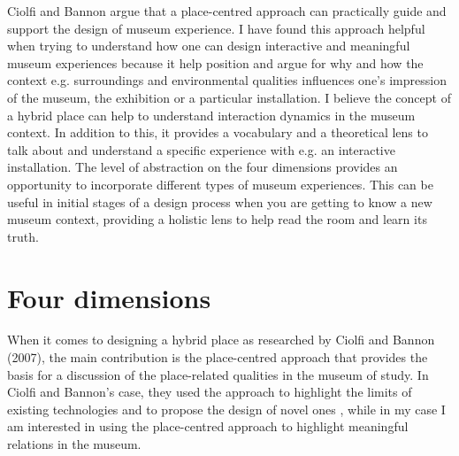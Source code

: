 \break

Ciolfi and Bannon argue that a place-centred approach can practically guide and support the design of museum experience. I have found this approach helpful when trying to understand how one can design interactive and meaningful museum experiences because it help position and argue for why and how the context e.g. surroundings and environmental qualities influences one's impression of the museum, the exhibition or a particular installation. I believe the concept of a hybrid place can help to understand interaction dynamics in the museum context. In addition to this, it provides a vocabulary and a theoretical lens to talk about and understand a specific experience with e.g. an interactive installation. The level of abstraction on the four dimensions provides an opportunity to incorporate different types of museum experiences. This can be useful in initial stages of a design process when you are getting to know a new museum context, providing a holistic lens to help read the room and learn its truth. 



\section{Four dimensions}
When it comes to designing a hybrid place as researched by Ciolfi and Bannon (2007), the main contribution is the place-centred approach that provides the basis for a discussion of the place-related qualities in the museum of study. In Ciolfi and Bannon's case, they used the approach to highlight the limits of existing technologies and to propose the design of novel ones \autocite[p. 163]{hybridplace_ciolfi}, while in my case I am interested in using the place-centred approach to highlight meaningful relations in the museum.

